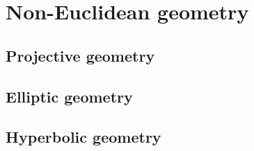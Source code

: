 \chapter{Non-Euclidean geometry}

\section{Projective geometry}

\section{Elliptic geometry}

\section{Hyperbolic geometry}
